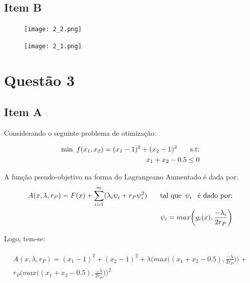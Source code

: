 \documentclass[a4paper, 12pt]{article}
\begin{document}
\subsection{Item B}



\begin{figure}[H]
  \centering
  \texttt{[image: 2\_2.png]}
\end{figure}%

\begin{figure}[H]
  \centering
  \texttt{[image: 2\_1.png]}
\end{figure}%

\newpage
\section*{Questão 3}
\subsection*{Item A}
Considerando o seguinte problema de otimização:

\begin{align*}
\begin{split}
\text{min\phantom{0}} f(x_1,x_2) = (x_1 - 1)^2 + (x_2 - 1)^2 \text{\phantom{000} s.t:} \\
x_1 + x_2 - 0.5 \leq 0
\end{split}
\end{align*}

A função pseudo-objetivo na forma do Lagrangeano Aumentado é dada por:
\begin{align*}
\begin{split}
A (x,\lambda, r_P) = F(x) + \sum_{i=1}^{m} (\lambda_i \psi_i + r_P \psi_i^2)  \text{\phantom{000} tal que\phantom{0}} \psi_i \text{\phantom{0} é dado por:} \\
\psi_i = max \bigg (  g_i(x), \frac{- \lambda_i}{2 r_{P}} \bigg )
\end{split}
\end{align*}

Logo, tem-se:

\begin{align*}
\begin{split}
A(x,\lambda,r_P) = (x_1 - 1)^2 + (x_2 - 1)^2 + \lambda \bigg ( max \bigg( ( x_1+x_2-0.5),\frac{- \lambda}{2 r_{P}} \bigg) \bigg ) + \\
r_P \bigg ( max \bigg( (x_1 + x_2 - 0.5),\frac{- \lambda}{2 r_{P}} \bigg) \bigg ) ^2
\end{split}
\end{align*}
\end{document}

